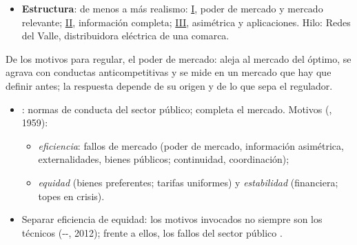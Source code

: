 \documentclass{article}
\begin{document}
\begin{columnas}
\begin{itemize}
\item \textbf{Estructura}: de menos a más realismo: \hyperref[rep:I]{I}, poder de mercado y mercado relevante; \hyperref[rep:II]{II}, información completa; \hyperref[rep:III]{III}, asimétrica y aplicaciones. Hilo: Redes del Valle, distribuidora eléctrica de una comarca.
\end{itemize}

\begin{ideaclave}
De los motivos para regular, el poder de mercado: aleja al mercado del óptimo, se agrava con conductas anticompetitivas y se mide en un mercado que hay que definir antes; la respuesta depende de su origen y de lo que sepa el regulador.
\end{ideaclave}

\begin{itemize}
\item {}: normas de conducta del sector público; completa el mercado. Motivos (, 1959):
  \begin{itemize}
  \item \emph{eficiencia}: fallos de mercado (poder de mercado, información asimétrica, externalidades, bienes públicos; continuidad, coordinación);
  \item \emph{equidad} (bienes preferentes; tarifas uniformes) y \emph{estabilidad} (financiera; topes en crisis).
  \end{itemize}
\item Separar eficiencia de equidad: los motivos invocados no siempre son los técnicos (--, 2012); frente a ellos, los fallos del sector público .
\end{itemize}


\end{columnas}
\end{document}
